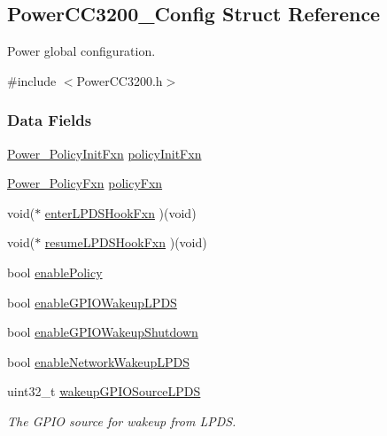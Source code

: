 \subsection{Power\+C\+C3200\+\_\+\+Config Struct Reference}
\label{struct_power_c_c3200___config}


Power global configuration.  




{\ttfamily \#include $<$Power\+C\+C3200.\+h$>$}

\subsubsection*{Data Fields}
\begin{DoxyCompactItemize}
\item 
\hyperlink{_power_8h_a435fdeb71d13ea6be86f599c9b6a0d78}{Power\+\_\+\+Policy\+Init\+Fxn} \hyperlink{struct_power_c_c3200___config_af931539deba8a64c4478af415aa9e260}{policy\+Init\+Fxn}
\item 
\hyperlink{_power_8h_a333038d1e9cd5f93dda7b83f8a1afa8b}{Power\+\_\+\+Policy\+Fxn} \hyperlink{struct_power_c_c3200___config_a11d7ce6a88c2ab91fceed9ea4cc24d59}{policy\+Fxn}
\item 
void($\ast$ \hyperlink{struct_power_c_c3200___config_a141ea8a9f0777ecbef65e5f1fa468823}{enter\+L\+P\+D\+S\+Hook\+Fxn} )(void)
\item 
void($\ast$ \hyperlink{struct_power_c_c3200___config_acd30f63935e03d3d90b32a27ac5c9787}{resume\+L\+P\+D\+S\+Hook\+Fxn} )(void)
\item 
bool \hyperlink{struct_power_c_c3200___config_a5ab4fa1286917e2ec3676e000fc355c2}{enable\+Policy}
\item 
bool \hyperlink{struct_power_c_c3200___config_a792fbe4d81f78db9fc1c1fdb7ab2bfd4}{enable\+G\+P\+I\+O\+Wakeup\+L\+P\+D\+S}
\item 
bool \hyperlink{struct_power_c_c3200___config_a17e5e5237ae1e22628d8e3e20f2d6450}{enable\+G\+P\+I\+O\+Wakeup\+Shutdown}
\item 
bool \hyperlink{struct_power_c_c3200___config_a0e23cab4699b252b7014101107525773}{enable\+Network\+Wakeup\+L\+P\+D\+S}
\item 
uint32\+\_\+t \hyperlink{struct_power_c_c3200___config_aea02bf2fcfdcac23a63c9d981775cf9a}{wakeup\+G\+P\+I\+O\+Source\+L\+P\+D\+S}
\begin{DoxyCompactList}\small\item\em The G\+P\+I\+O source for wakeup from L\+P\+D\+S. \end{DoxyCompactList}\item 

\end{DoxyCompactItemize}
